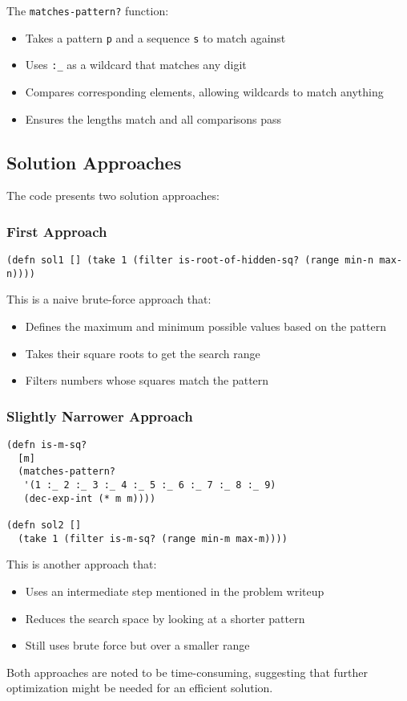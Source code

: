 \documentclass{article}
\begin{document}
The \texttt{matches-pattern?} function:
\begin{itemize}
    \item Takes a pattern \texttt{p} and a sequence \texttt{s} to match against
    \item Uses \texttt{:\_} as a wildcard that matches any digit
    \item Compares corresponding elements, allowing wildcards to match anything
    \item Ensures the lengths match and all comparisons pass
\end{itemize}

\subsection{Solution Approaches}

The code presents two solution approaches:

\subsubsection{First Approach}
\begin{lstlisting}
(defn sol1 [] (take 1 (filter is-root-of-hidden-sq? (range min-n max-n))))
\end{lstlisting}

This is a naive brute-force approach that:
\begin{itemize}
    \item Defines the maximum and minimum possible values based on the pattern
    \item Takes their square roots to get the search range
    \item Filters numbers whose squares match the pattern
\end{itemize}

\subsubsection{Slightly Narrower Approach}
\begin{lstlisting}
(defn is-m-sq?
  [m]
  (matches-pattern?
   '(1 :_ 2 :_ 3 :_ 4 :_ 5 :_ 6 :_ 7 :_ 8 :_ 9)
   (dec-exp-int (* m m))))

(defn sol2 [] 
  (take 1 (filter is-m-sq? (range min-m max-m))))
\end{lstlisting}

This is another approach that:
\begin{itemize}
    \item Uses an intermediate step mentioned in the problem writeup
    \item Reduces the search space by looking at a shorter pattern
    \item Still uses brute force but over a smaller range
\end{itemize}

Both approaches are noted to be time-consuming, suggesting that further optimization might be needed for an efficient solution.
\end{document}
